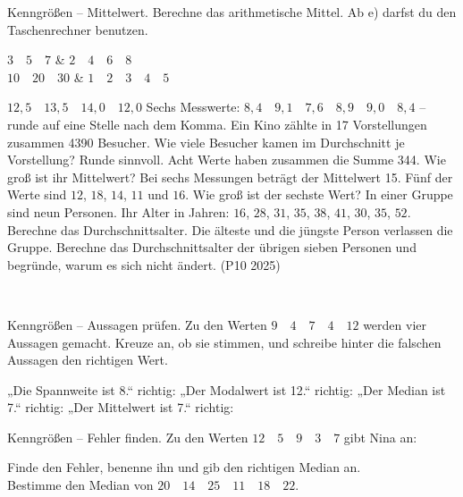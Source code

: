 \begin{aufgabe}{Kenngrößen -- Mittelwert. Berechne das arithmetische Mittel. Ab e) darfst du den Taschenrechner benutzen.}
\begin{teilezwei}
\tz $3 \quad 5 \quad 7$ \leerfeld & \tz $2 \quad 4 \quad 6 \quad 8$ \leerfeld \\
\tz $10 \quad 20 \quad 30$ \leerfeld & \tz $1 \quad 2 \quad 3 \quad 4 \quad 5$ \leerfeld \\
\end{teilezwei}
\begin{teile}
\teil $12{,}5 \quad 13{,}5 \quad 14{,}0 \quad 12{,}0$ \leerfeld
\teil Sechs Messwerte: $8{,}4 \quad 9{,}1 \quad 7{,}6 \quad 8{,}9 \quad 9{,}0 \quad 8{,}4$ -- runde auf eine Stelle nach dem Komma. \leerfeld
\teil Ein Kino zählte in 17 Vorstellungen zusammen 4390 Besucher. Wie viele Besucher kamen im Durchschnitt je Vorstellung? Runde sinnvoll. \leerfeld
\teil Acht Werte haben zusammen die Summe 344. Wie groß ist ihr Mittelwert? \leerfeld
\teil Bei sechs Messungen beträgt der Mittelwert 15. Fünf der Werte sind $12$, $18$, $14$, $11$ und $16$. Wie groß ist der sechste Wert? \leerfeld
\teil In einer Gruppe sind neun Personen. Ihr Alter in Jahren: $16$, $28$, $31$, $35$, $38$, $41$, $30$, $35$, $52$. Berechne das Durchschnittsalter. Die älteste und die jüngste Person verlassen die Gruppe. Berechne das Durchschnittsalter der übrigen sieben Personen und begründe, warum es sich nicht ändert. (P10 2025)
\par {} \quad {} \\[12pt]
\end{teile}
\end{aufgabe}

\begin{aufgabe}{Kenngrößen -- Aussagen prüfen. Zu den Werten $9 \quad 4 \quad 7 \quad 4 \quad 12$ werden vier Aussagen gemacht. Kreuze an, ob sie stimmen, und schreibe hinter die falschen Aussagen den richtigen Wert.}
\begin{teile}
\teil „Die Spannweite ist 8.“ \hfill \janein \quad richtig: \leerfeld
\teil „Der Modalwert ist 12.“ \hfill \janein \quad richtig: \leerfeld
\teil „Der Median ist 7.“ \hfill \janein \quad richtig: \leerfeld
\teil „Der Mittelwert ist 7.“ \hfill \janein \quad richtig: \leerfeld
\end{teile}
\end{aufgabe}

\begin{aufgabe}{Kenngrößen -- Fehler finden.}
Zu den Werten $12 \quad 5 \quad 9 \quad 3 \quad 7$ gibt Nina an:
\begin{teile}
\teil Finde den Fehler, benenne ihn und gib den richtigen Median an. \\[12pt]
\teil Bestimme den Median von $20 \quad 14 \quad 25 \quad 11 \quad 18 \quad 22$. \leerfeld
\end{teile}
\end{aufgabe}

